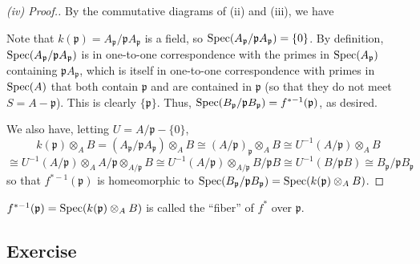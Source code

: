 \begin{proof}[(iv) Proof.]
By the commutative diagrams of (ii) and (iii), we have
\begin{center}
\end{center}
Note that $k(\mathfrak{p}) = A_{\mathfrak{p}}/\mathfrak{p}A_{\mathfrak{p}}$ is a field, so $\operatorname{Spec}(A_{\mathfrak{p}}/\mathfrak{p}A_{\mathfrak{p}}) = \{0\}$. By definition,
$\operatorname{Spec}(A_{\mathfrak{p}}/\mathfrak{p}A_{\mathfrak{p}})$ is in one-to-one correspondence with the primes in $\operatorname{Spec}(A_{\mathfrak{p}})$ containing $\mathfrak{p}A_{\mathfrak{p}}$,
which is itself in one-to-one correspondence with primes in $\operatorname{Spec}(A)$ that both contain $\mathfrak{p}$ and are contained in $\mathfrak{p}$ (so that they do not meet $S = A-\mathfrak{p}$). This is clearly
$\{\mathfrak{p}\}$. Thus, $\operatorname{Spec}(B_{\mathfrak{p}}/\mathfrak{p}B_{\mathfrak{p}}) = f^{*-1}(\mathfrak{p})$, as desired.

We also have, letting $U = A/\mathfrak{p} - \{0\}$,
$$k(\mathfrak{p}) \otimes_A B = (A_{\mathfrak{p}}/\mathfrak{p}A_{\mathfrak{p}}) \otimes_A B \cong (A/\mathfrak{p})_{\mathfrak{p}} \otimes_A B \cong U^{-1}(A/\mathfrak{p}) \otimes_A B$$
$$\cong U^{-1}(A/\mathfrak{p}) \otimes_A A/\mathfrak{p} \otimes_{A/\mathfrak{p}} B \cong U^{-1}(A/\mathfrak{p}) \otimes_{A/\mathfrak{p}} B/\mathfrak{p}B \cong U^{-1}(B/\mathfrak{p}B)
\cong B_{\mathfrak{p}}/\mathfrak{p}B_{\mathfrak{p}}$$
so that $f^{*-1}(\mathfrak{p})$ is homeomorphic to $\operatorname{Spec}(B_{\mathfrak{p}}/\mathfrak{p}B_{\mathfrak{p}}) = \operatorname{Spec}(k(\mathfrak{p}) \otimes_A B)$.
\end{proof}

\begin{remark}
$f^{*-1}(\mathfrak{p}) = \operatorname{Spec}(k(\mathfrak{p}) \otimes_A B)$ is called the ``fiber'' of $f^*$ over $\mathfrak{p}$.
\end{remark}

\subsection{Exercise}\label{3.22}


